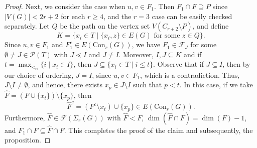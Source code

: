 \documentclass[10pt,a4paper]{amsart}
\newcommand{\Con}{{\mathrm{Con}}}
\def\F{\mathcal{F}}
\begin{document}
\begin{proof}
		   Next, we consider the case when $u,v\in F_1$. Then $F_1\cap F\supseteq P$ since $|V(G)|<2r+2$ for each $r\ge 4$, and the $r=3$ case can be easily checked separately. Let $Q$ be the path on the vertex set $V(C_{r+2}\setminus P)$, and define
		   \[
		   K=\{x_i\in T\mid \{x_i,z\}\in E(G)\text{ for some }z\in Q\}.
		   \]
		   Since $u,v\in F_1$ and $F_1^c\in E(\Con_r(G))$, we have $F_1\in \F_J$ for some $\emptyset\neq J\in \mathcal P(T)$ with $J\lessdot I$ and $J\neq I$. Moreover, $I,J\subseteq K$ and if $t=\max_{<_{\mathbb N}}\{i\mid x_i\in I\}$, then $J\subseteq \{x_i\in T\mid i\le t\}$. Observe that if $J\subseteq I$, then by our choice of ordering, $J=I$, since $u,v\in F_1$, which is a contradiction. Thus, $J\setminus I\neq\emptyset$, and hence, there exists $x_p\in J\setminus I$ such that $p<t$. In this case, if we take $\widehat F=(F\cup\{x_t\})\setminus\{x_p\}$, then 
		   \[
		   \widehat{F}^c=(F^c\setminus x_t)\cup\{x_p\}\in E(\Con_r(G)).
		   \]
		   Furthermore, $\widehat F\in \F(\Sigma_{r}(G))$ with $\widehat F<F$, $\dim(\widehat F\cap F)=\dim(F)-1$, and $F_1\cap F\subseteq \widehat F\cap F$. This completes the proof of the claim and subsequently, the proposition.
	\end{proof}
\end{document}
